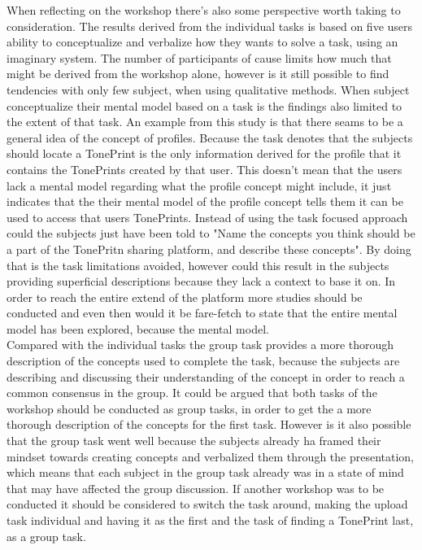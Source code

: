 When reflecting on the workshop there's also some perspective worth taking to consideration. The results derived from the individual tasks is based on five users ability to conceptualize and verbalize how they wants to solve a task, using an imaginary system. The number of participants of cause limits how much that might be derived from the workshop alone, however is it still possible to find tendencies with only few subject, when using qualitative methods. When subject conceptualize their mental model based on a task is the findings also limited to the extent of that task. An example from this study is that there seams to be a general idea of the concept of profiles. Because the task denotes that the subjects should locate a TonePrint is the only information derived for the profile that it contains the TonePrints created by that user. This doesn't mean that the users lack a mental model regarding what the profile concept might include, it just indicates that the their mental model of the profile concept tells them it can be used to access that users TonePrints. Instead of using the task focused approach could the subjects just have been told to "Name the concepts you think should be a part of the TonePritn sharing platform, and describe these concepts". By doing that is the task limitations avoided, however could this result in the subjects providing superficial descriptions because they lack a context to base it on. In order to reach the entire extend of the platform more studies should be conducted and even then would it be fare-fetch to state that the entire mental model has been explored, because the mental model. \\
Compared with the individual tasks the group task provides a more thorough description of the concepts used to complete the task, because the subjects are describing and discussing their understanding of the concept in order to reach a common consensus in the group. It could be argued that both tasks of the workshop should be conducted as group tasks, in order to get the a more thorough description of the concepts for the first task. However is it also possible that the group task went well because the subjects already ha framed their mindset towards creating concepts and verbalized them through the presentation, which means that each subject in the group task already was in a state of mind that may have affected the group discussion. If another workshop was to be conducted it should be considered to switch the task around, making the upload task individual and having it as the first and the task of finding a TonePrint last, as a group task.\\






